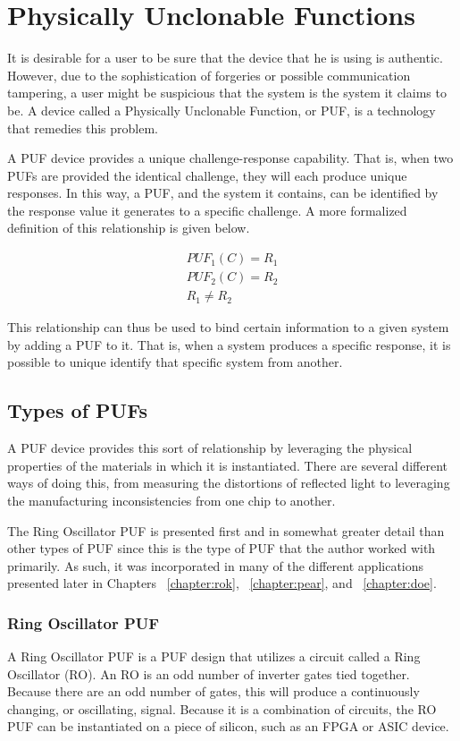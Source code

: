 
\chapter{Physically Unclonable Functions}
\label{chapter:pufoverview}
It is desirable for a user to be sure that the device that he is using is authentic. However, due to the sophistication
of forgeries or possible communication tampering, a user might be suspicious that the system is the system it claims
to be. A device called a Physically Unclonable Function, or PUF, is a technology that remedies this problem.

A PUF device provides a unique challenge-response capability. That is, when two PUFs are provided the identical
challenge, they will each produce unique responses. In this way, a PUF, and the system it contains, 
can be identified by the response value it generates to a specific challenge. A more formalized definition of
this relationship is given below.

\begin{align*}
PUF_1(C) = R_1\\
PUF_2(C) = R_2\\
R_1 \neq R_2
\end{align*}

This relationship can thus be used to bind certain information to a given system by adding a PUF
to it. That is, when a system produces a specific response, it is possible to unique identify that 
specific system from another.

\section{Types of PUFs}
A PUF device provides this sort of relationship by leveraging the physical properties
of the materials in which it is instantiated. There are several different ways of doing
this, from measuring the distortions of reflected light to leveraging the
manufacturing inconsistencies from one chip to another.

The Ring Oscillator PUF is presented first and in somewhat greater detail than
other types of PUF since this is the type of PUF that the author worked with primarily.
As such, it was incorporated in many of the different applications presented later in
Chapters ~\ref{chapter:rok}, ~\ref{chapter:pear}, and ~\ref{chapter:doe}.

\subsection{Ring Oscillator PUF}
A Ring Oscillator PUF is a PUF design that utilizes a circuit called a Ring 
Oscillator (RO). An RO is an odd number of inverter gates tied together. Because
there are an odd number of gates, this will produce a continuously changing,
or oscillating, signal. Because it is a combination of circuits, the RO PUF can
be instantiated on a piece of silicon, such as an FPGA or ASIC device.

